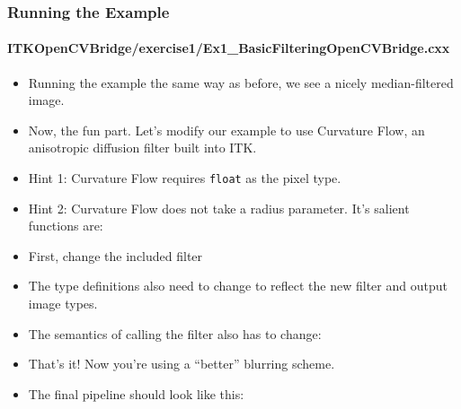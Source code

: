 \begin{frame}
\frametitle{Running the Example}
\framesubtitle{ITKOpenCVBridge/exercise1/Ex1\_BasicFilteringOpenCVBridge.cxx}
\begin{itemize}
\item Running the example the same way as before, we see a nicely
median-filtered image.
\pause
\item Now, the fun part. Let's modify our example to use Curvature Flow, an
anisotropic diffusion filter built into ITK.
\end{itemize}
\end{frame}

\begin{frame}
\begin{itemize}
\frametitle{Exercise 1}
\framesubtitle{ITKOpenCVBridge/exercise1/Ex1\_BasicFilteringOpenCVBridge.cxx}
\item Hint 1: Curvature Flow requires {\tt float} as the pixel
  type.
\pause
\item Hint 2: Curvature Flow does not take a radius parameter. It's
  salient functions are:
\end{itemize}
\end{frame}

\begin{frame}
\begin{itemize}
\frametitle{Exercise 1 (Answer)}
\framesubtitle{ITKOpenCVBridge/exercise1/Ex1\_BasicFilteringOpenCVBridgeAnswer.cxx}
\item First, change the included filter
\pause
\item The type definitions also need to change to reflect the new
  filter and output image types.
\end{itemize}
\end{frame}

\begin{frame}
\begin{itemize}
\frametitle{Exercise 1 (Answer)}
\framesubtitle{ITKOpenCVBridge/exercise1/Ex1\_BasicFilteringOpenCVBridgeAnswer.cxx}
\item The semantics of calling the filter also has to change:
\pause
\item That's it! Now you're using a ``better'' blurring scheme.
\end{itemize}
\end{frame}

\begin{frame}
\begin{itemize}
\frametitle{Exercise 1 (Answer)}
\framesubtitle{ITKOpenCVBridge/exercise1/Ex1\_BasicFilteringOpenCVBridgeAnswer.cxx}
\item The final pipeline should look like this:
\end{itemize}
\end{frame}

